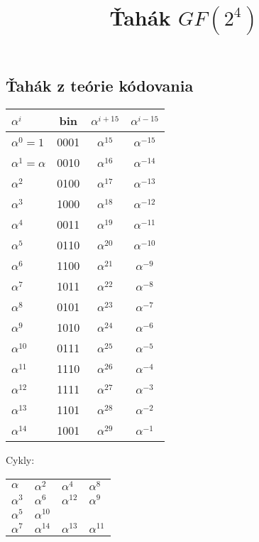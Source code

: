\documentclass[12pt,a4paper]{article}
\title{Ťahák $GF(2^4)$}
\begin{document}
\thispagestyle{empty}

\begin{center}
\section*{Ťahák z teórie kódovania}
\end{center}

\vspace{1cm}

\begin{minipage}{.5\textwidth}
\begin{tabular}{lccc}\toprule
$\alpha^i$ & bin & $\alpha^{i+15}$ & $\alpha^{i-15}$ \\ \midrule
$\alpha^0 = 1$ & 0001 & $\alpha^{15}$ & $\alpha^{-15}$ \\
$\alpha^1 = \alpha$ & 0010 & $\alpha^{16}$ & $\alpha^{-14}$ \\
$\alpha^2$ & 0100 & $\alpha^{17}$ & $\alpha^{-13}$ \\
$\alpha^3$ & 1000 & $\alpha^{18}$ & $\alpha^{-12}$ \\
$\alpha^4$ & 0011 & $\alpha^{19}$ & $\alpha^{-11}$ \\
$\alpha^5$ & 0110 & $\alpha^{20}$ & $\alpha^{-10}$ \\
$\alpha^6$ & 1100 & $\alpha^{21}$ & $\alpha^{-9}$ \\
$\alpha^7$ & 1011 & $\alpha^{22}$ & $\alpha^{-8}$ \\
$\alpha^8$ & 0101 & $\alpha^{23}$ & $\alpha^{-7}$ \\
$\alpha^9$ & 1010 & $\alpha^{24}$ & $\alpha^{-6}$ \\
$\alpha^{10}$ & 0111 & $\alpha^{25}$ & $\alpha^{-5}$ \\
$\alpha^{11}$ & 1110 & $\alpha^{26}$ & $\alpha^{-4}$ \\
$\alpha^{12}$ & 1111 & $\alpha^{27}$ & $\alpha^{-3}$ \\
$\alpha^{13}$ & 1101 & $\alpha^{28}$ & $\alpha^{-2}$ \\
$\alpha^{14}$ & 1001 & $\alpha^{29}$ & $\alpha^{-1}$ \\
\bottomrule
\end{tabular}
\end{minipage}
\begin{minipage}{.5\textwidth}
Cykly:

\begin{tabular}{llll}
$\alpha$ & $\alpha^{2}$ & $\alpha^{4}$ & $\alpha^{8}$ \\
$\alpha^{3}$ & $\alpha^{6}$ & $\alpha^{12}$ & $\alpha^{9}$ \\
$\alpha^{5}$ & $\alpha^{10}$ & &\\
$\alpha^{7}$ & $\alpha^{14}$ & $\alpha^{13}$ & $\alpha^{11}$  \\
\end{tabular}
\end{minipage}
\end{document}
